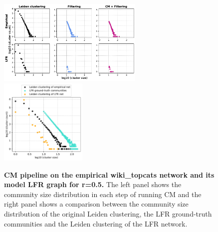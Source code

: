 \documentclass[a4paper]{article}   	%
\begin{document}
\begin{figure}[h!]
\centering
\includegraphics[width=0.62\textwidth]{figs/wiki_topcats_cm_steps_lfr5.pdf}
\includegraphics[width=0.37\textwidth]{figs/wiki_topcats_5_cm_size.pdf}
\caption[CM pipeline on the wiki\_topcats s network and its model LFR graph for r=0.5]{\textbf{CM pipeline on the empirical wiki\_topcats network and its model LFR graph for r=0.5.} The left panel shows the community size distribution in each step of running CM and the right panel shows a comparison between the community size distribution of the original Leiden clustering, the LFR ground-truth communities and the Leiden clustering of the LFR network.}
\label{fig:wikitopcats-cm-lfr-5}
\end{figure}
\end{document}
